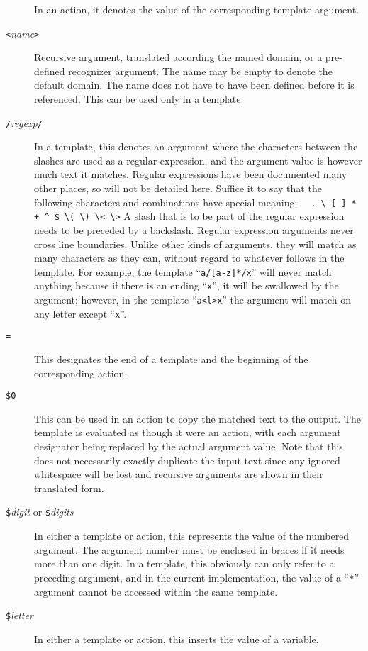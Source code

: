 \begin{description}
In an action, it denotes the value of the corresponding template argument.
\item[{\tt <}{\it name}{\tt >}]
Recursive argument, translated according the named domain,
or a pre-defined recognizer argument.  The name may be empty to denote
the default domain.
The name does not have to have been defined before it is referenced.
This can be used only in a template.
\item[{\tt /}{\it regexp}{\tt /}]
In a template, this denotes an argument where
the characters between the slashes are used as a regular expression,
and the argument value is however much text it matches.
Regular expressions have been documented many other places, so will not
be detailed here.  Suffice it to say that the following characters and
combinations have special meaning:\newline
\verb|  . \ [ ] * + ^ $ \( \) \< \>|
\newline
A slash that is to be part of the regular expression needs to be
preceded by a backslash.
Regular expression arguments never cross line boundaries.
Unlike other kinds of arguments, they will match as many characters as
they can, without regard to whatever follows in the template.
For example, the template ``\verb|a/[a-z]*/x|'' will never match anything
because if there is an ending ``\verb/x/'', it will be swallowed by the
argument; however, in the template ``\verb|a<l>x|'' the argument will match
on any letter except ``\verb/x/''.
\item[{\tt =}]
This designates the end of a template and the beginning of the
corresponding action.
\item[{\tt \$0}]
This can be used in an action to copy the matched text to the output.
The template is evaluated as though it were an action, with each
argument designator being replaced by the actual argument value.
Note that this does not necessarily exactly duplicate the input text
since any ignored whitespace will be lost and recursive arguments are shown in
their translated form.
\item[{\tt \$}{\it digit} or {\tt \$\ttlb}{\it digits}{\tt \ttrb}]
In either a template or action, this represents the value of the
numbered argument.  The argument number must be enclosed in braces if it
needs more than one digit.  In a template, this obviously can only refer
to a preceding argument, and in the current implementation, the value of a
``\verb/*/'' argument cannot be accessed within the same template.
\item[{\tt \$}{\it letter}]
In either a template or action, this inserts the value of a variable,

\end{description}
